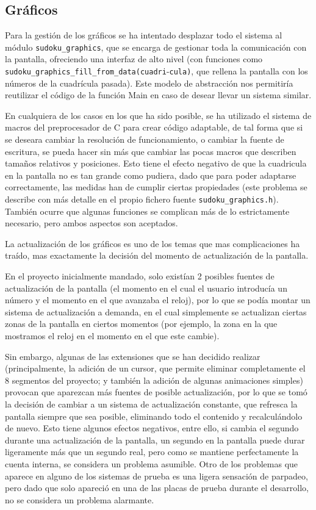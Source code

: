 \documentclass[12pt,letterpaper]{article}
\begin{document}
\subsection{Gráficos}
\label{subsec:graficos}
Para la gestión de los gráficos se ha intentado desplazar todo el
sistema al módulo \texttt{sudoku\_graphics}, que se encarga de
gestionar toda la comunicación con la pantalla, ofreciendo una
interfaz de alto nivel (con funciones como
\texttt{sudoku\_graphics\_fill\_from\_data(cuadri}-\texttt{cula)},
que rellena la pantalla con los números de la cuadrícula pasada). Este
modelo de abstracción nos permitiría reutilizar el código de la
función Main en caso de desear llevar un sistema similar.

En cualquiera de los casos en los que ha sido posible, se ha utilizado
el sistema de macros del preprocesador de C para crear código
adaptable, de tal forma que si se deseara cambiar la resolución de
funcionamiento, o cambiar la fuente de escritura, se pueda hacer sin
más que cambiar las pocas macros que describen tamaños relativos y
posiciones. Esto tiene el efecto negativo de que la cuadricula en la
pantalla no es tan grande como pudiera, dado que para poder adaptarse
correctamente, las medidas han de cumplir ciertas propiedades (este
problema se describe con más detalle en el propio fichero fuente
\texttt{sudoku\_graphics.h}). También ocurre que algunas funciones se
complican más de lo estrictamente necesario, pero ambos aspectos son
aceptados.

La actualización de los gráficos es uno de los temas que mas
complicaciones ha traído, mas exactamente la decisión del momento de
actualización de la pantalla.

En el proyecto inicialmente mandado, solo existían 2 posibles fuentes
de actualización de la pantalla (el momento en el cual el usuario
introducía un número y el momento en el que avanzaba el reloj), por lo
que se podía montar un sistema de actualización a demanda, en el cual
simplemente se actualizan ciertas zonas de la pantalla en ciertos
momentos (por ejemplo, la zona en la que mostramos el reloj en el
momento en el que este cambie).

Sin embargo, algunas de las extensiones que se han decidido realizar
(principalmente, la adición de un cursor, que permite eliminar
completamente el 8 segmentos del proyecto; y también la adición de
algunas animaciones simples) provocan que aparezcan más fuentes de
posible actualización, por lo que se tomó la decisión de cambiar a un
sistema de actualización constante, que refresca la pantalla siempre
que sea posible, eliminando todo el contenido y recalculándolo de
nuevo. Esto tiene algunos efectos negativos, entre ello, si cambia el
segundo durante una actualización de la pantalla, un segundo en la
pantalla puede durar ligeramente más que un segundo real, pero como se
mantiene perfectamente la cuenta interna, se considera un problema
asumible. Otro de los problemas que aparece en alguno de los sistemas
de prueba es una ligera sensación de parpadeo, pero dado que solo
apareció en una de las placas de prueba durante el desarrollo, no se
considera un problema alarmante.\\
\end{document}

